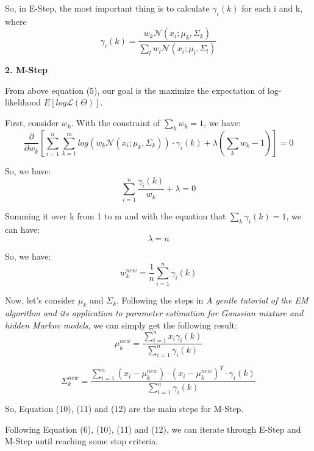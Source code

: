\begin{description}
So, in E-Step, the most important thing is to calculate $\gamma_i(k)$ for each i and k, where 
\begin{equation}
\gamma_i(k) = \frac{w_k \mathcal{N}(x_i; \mu_k, \Sigma_k)}{\sum_l w_l \mathcal{N}(x_i; \mu_l, \Sigma_l)}
\end{equation}


\item{\bf \large 2. M-Step}

From above equation (5), our goal is the maximize the expectation of log-likelihood $E[log\mathcal{L}(\Theta)]$.

First, consider $w_k$. With the constraint of $\sum_k w_k = 1$, we have:
\begin{equation}
\frac{\partial}{\partial w_k} [\sum_{i=1}^n \sum_{k=1}^m log(w_k \mathcal{N}(x_i; \mu_k, \Sigma_k))\cdot \gamma_i(k) + \lambda(\sum_k w_k - 1)] = 0
\end{equation}

So, we have: 
\begin{equation}
\sum_{i=1}^n \frac{\gamma_i(k)}{w_k} + \lambda = 0
\end{equation}

Summing it over k from 1 to m and with the equation that $\sum_k \gamma_i(k) = 1$, we can have:
\begin{equation}
\lambda = n
\end{equation}

So, we have:
\begin{equation}
	w_k^{new} = \frac{1}{n} \sum_{i=1}^n \gamma_i(k)
\end{equation}

Now, let's consider $\mu_k$ and $\Sigma_k$. Following the steps in {\it A gentle tutorial of the EM algorithm and its application to parameter estimation for Gaussian mixture and hidden Markov models}, we can simply get the following result:
\begin{equation}
	\mu_k^{new} = \frac{\sum_{i=1}^n x_i \gamma_i(k)}{\sum_{i=1}^n \gamma_i(k)}
\end{equation}


\begin{equation}
	\Sigma_k^{new} = \frac{\sum_{i=1}^n (x_i - \mu_k^{new}) \cdot (x_i - \mu_k^{new})^T \cdot \gamma_i(k)}{\sum_{i=1}^n \gamma_i(k)}
\end{equation}

So, Equation (10), (11) and (12) are the main steps for M-Step.

Following Equation (6), (10), (11) and (12), we can iterate through E-Step and M-Step until reaching some stop criteria.

\end{description}

